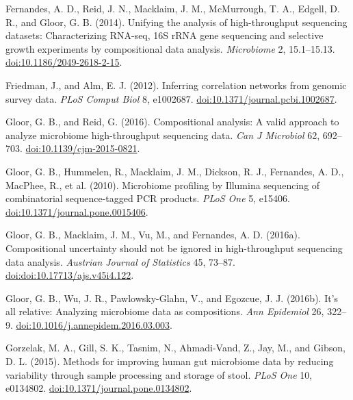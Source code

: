 \documentclass[twocolumn]{article}
\begin{document}
Fernandes, A. D., Reid, J. N., Macklaim, J. M., McMurrough, T. A.,
Edgell, D. R., and Gloor, G. B. (2014). Unifying the analysis of
high-throughput sequencing datasets: Characterizing RNA-seq, 16S rRNA
gene sequencing and selective growth experiments by compositional data
analysis. \emph{Microbiome} 2, 15.1--15.13.
\href{http://doi.org/10.1186/2049-2618-2-15}{doi:10.1186/2049-2618-2-15}.

Friedman, J., and Alm, E. J. (2012). Inferring correlation networks from
genomic survey data. \emph{PLoS Comput Biol} 8, e1002687.
\href{http://doi.org/10.1371/journal.pcbi.1002687}{doi:10.1371/journal.pcbi.1002687}.

Gloor, G. B., and Reid, G. (2016). Compositional analysis: A valid
approach to analyze microbiome high-throughput sequencing data.
\emph{Can J Microbiol} 62, 692--703.
\href{http://doi.org/10.1139/cjm-2015-0821}{doi:10.1139/cjm-2015-0821}.

Gloor, G. B., Hummelen, R., Macklaim, J. M., Dickson, R. J., Fernandes,
A. D., MacPhee, R., et al. (2010). Microbiome profiling by Illumina
sequencing of combinatorial sequence-tagged PCR products. \emph{PLoS
One} 5, e15406.
\href{http://doi.org/10.1371/journal.pone.0015406}{doi:10.1371/journal.pone.0015406}.

Gloor, G. B., Macklaim, J. M., Vu, M., and Fernandes, A. D. (2016a).
Compositional uncertainty should not be ignored in high-throughput
sequencing data analysis. \emph{Austrian Journal of Statistics} 45,
73--87.
\href{http://doi.org/doi:10.17713/ajs.v45i4.122}{doi:doi:10.17713/ajs.v45i4.122}.

Gloor, G. B., Wu, J. R., Pawlowsky-Glahn, V., and Egozcue, J. J.
(2016b). It's all relative: Analyzing microbiome data as compositions.
\emph{Ann Epidemiol} 26, 322--9.
\href{http://doi.org/10.1016/j.annepidem.2016.03.003}{doi:10.1016/j.annepidem.2016.03.003}.

Gorzelak, M. A., Gill, S. K., Tasnim, N., Ahmadi-Vand, Z., Jay, M., and
Gibson, D. L. (2015). Methods for improving human gut microbiome data by
reducing variability through sample processing and storage of stool.
\emph{PLoS One} 10, e0134802.
\href{http://doi.org/10.1371/journal.pone.0134802}{doi:10.1371/journal.pone.0134802}.
\end{document}
